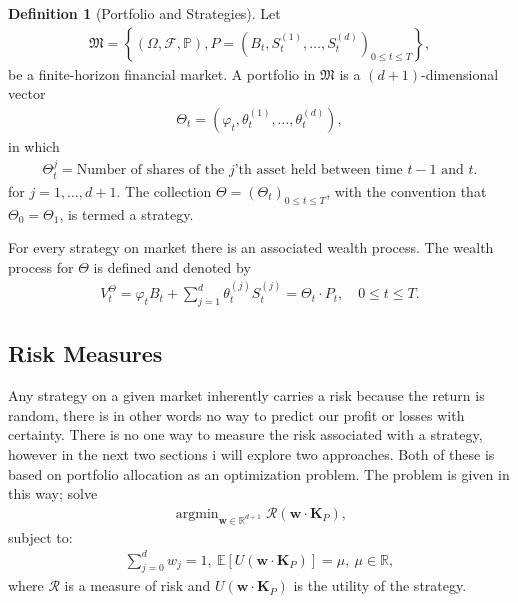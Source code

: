 \documentclass{article}
\theoremstyle{definition}
\newtheorem{definition}[theorem]{Definition}
\numberwithin{equation}{section}
\DeclareMathOperator*{\argmin}{argmin}
\begin{document}
\begin{definition}[Portfolio and Strategies]
    Let
    \begin{align}
        \mathfrak{M} = \left\{ 
            \left(
                \Omega, \mathscr{F}, \mathbb{P}
            \right),
            P = \left(
                B_t, S_t^{(1)}, \ldots, S_t^{(d)}
            \right)_{0 \leq t \leq T}
         \right\},
    \end{align}
    be a finite-horizon financial market.
    A portfolio in $\mathfrak{M}$ is a $(d + 1)$-dimensional vector
    \begin{align}
        \Theta_t = \left(\varphi_t, \theta_t^{(1)}, \ldots, \theta_t^{(d)}\right),
    \end{align}
    in which
    \begin{align}
        \Theta_t^j = \text{Number of shares of the $j$'th asset held between time $t-1$ and $t$}.
    \end{align}
    for $j = 1, \ldots, d + 1$.
    The collection $\Theta = \left( \Theta_t \right)_{0 \leq t \leq T}$, with the convention that $\Theta_0 = \Theta_1$, is termed a strategy.
\end{definition}
For every strategy on market there is an associated wealth process.
The wealth process for $\Theta$ is defined and denoted by
\begin{align}
    V_t^{\Theta} = \varphi_t B_t + \sum_{j = 1}^d \theta_t^{(j)} S_t^{(j)} = \Theta_t \cdot P_t, \quad 0 \leq t \leq T.    
\end{align}

\subsection{Risk Measures}
Any strategy on a given market inherently carries a risk because the return is random, there is in other words no way to predict our profit or losses with certainty.
There is no one way to measure the risk associated with a strategy, however in the next two sections i will explore two approaches.
Both of these is based on portfolio allocation as an optimization problem.
The problem is given in this way; solve
\begin{align}
    \argmin_{\mathbf{w}\in\mathbb{R}^{d+1}}
    \mathcal{R}\left( \mathbf{w} \cdot \mathbf{K}_P \right),
\end{align}
subject to:
\begin{align}
    \sum_{j = 0}^d w_j = 1, \ 
    \mathbb{E}\left[ U(\mathbf{w} \cdot \mathbf{K}_P) \right] = \mu, \
    \mu \in \mathbb{R},
\end{align}
where $\mathcal{R}$ is a measure of risk and $U(\mathbf{w} \cdot \mathbf{K}_P)$ is the utility of the strategy.
\end{document}

